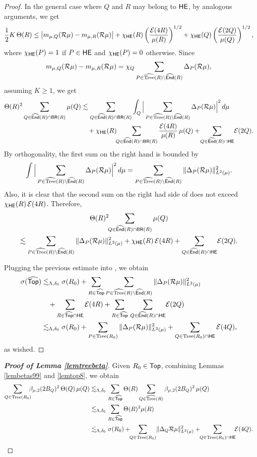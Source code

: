 \begin{proof}
In the general case where $Q$ and $R$ may belong to ${\mathsf {HE}}$, by analogous arguments, we get
$$\frac12K\,\Theta(R) \leq 
\big|m_{\mu,Q}({\mathcal R}\mu) - m_{\mu,R}({\mathcal R}\mu)\big| + \chi_{\mathsf {HE}}(R) \left(\frac{{\mathcal E}(4R)}{\mu(R)}\right)^{1/2}
+ \chi_{\mathsf {HE}}(Q) \left(\frac{{\mathcal E}(2Q)}{\mu(Q)}\right)^{1/2},$$
where $\chi_{\mathsf {HE}}(P)=1$ if $P\in{\mathsf {HE}}$ and $\chi_{\mathsf {HE}}(P)=0$ otherwise. Since
$$m_{\mu,Q}({\mathcal R}\mu) - m_{\mu,R}({\mathcal R}\mu) = \chi_Q \sum_{P\in{\widehat{{\rm Tree}}}(R)\setminus{\widehat{{\mathsf{End}}}}(R)}\Delta_P({\mathcal R}\mu),$$
assuming $K\geq1$, we get
\begin{align}\label{eqfje42}
\Theta(R)^2\sum_{Q\in{\widehat{{\mathsf{End}}}}(R)\cap{\mathsf {BR}}(R)}\mu(Q) &\lesssim 
\sum_{Q\in{\widehat{{\mathsf{End}}}}(R)\cap{\mathsf {BR}}(R)} \int_Q \Big|\sum_{P\in{\widehat{{\rm Tree}}}(R)\setminus{\widehat{{\mathsf{End}}}}(R)}\Delta_P({\mathcal R}\mu)
\Big|^2\,d\mu \\
&\quad + \chi_{\mathsf {HE}}(R)\!\!\sum_{Q\in{\widehat{{\mathsf{End}}}}(R)\cap{\mathsf {BR}}(R)}  \frac{{\mathcal E}(4R)}{\mu(R)}\,\mu(Q) +\!
\sum_{Q\in{\widehat{{\mathsf{End}}}}(R)\cap{\mathsf {HE}}} \! {\mathcal E}(2Q).\nonumber
\end{align}
By orthogonality, the first sum on the right hand is bounded by
$$\int \Big|\sum_{P\in{\widehat{{\rm Tree}}}(R)\setminus{\widehat{{\mathsf{End}}}}(R)}\Delta_P({\mathcal R}\mu)
\Big|^2\,d\mu = \sum_{P\in{\widehat{{\rm Tree}}}(R)\setminus{\widehat{{\mathsf{End}}}}(R)}\|\Delta_P({\mathcal R}\mu)\|_{L^2(\mu)}^2.$$
Also, it is clear that the second sum on the right had side of  does not exceed 
$\chi_{\mathsf {HE}}(R)\,{\mathcal E}(4R)$. Therefore,
\begin{multline*}
\Theta(R)^2\!\!\sum_{Q\in{\widehat{{\mathsf{End}}}}(R)\cap{\mathsf {BR}}(R)}\mu(Q) \\
\lesssim
\sum_{P\in{\widehat{{\rm Tree}}}(R)\setminus{\widehat{{\mathsf{End}}}}(R)}\|\Delta_P({\mathcal R}\mu)\|_{L^2(\mu)}^2
+ \chi_{\mathsf {HE}}(R)\,{\mathcal E}(4R) + \sum_{Q\in{\widehat{{\mathsf{End}}}}(R)\cap{\mathsf {HE}}} \! {\mathcal E}(2Q).
\end{multline*}

Plugging the previous estimate into , we obtain
\begin{align*}
\sigma({\widehat{{\mathsf {Top}}}})  & \lesssim_{\Lambda,\delta_0} \sigma(R_0) + \sum_{R\in{\widehat{{\mathsf {Top}}}}} 
\sum_{P\in{\widehat{{\rm Tree}}}(R)\setminus{\widehat{{\mathsf{End}}}}(R)}\|\Delta_P({\mathcal R}\mu)\|_{L^2(\mu)}^2\\
&\quad
+ \sum_{R\in{\widehat{{\mathsf {Top}}}}\cap{\mathsf {HE}}}{\mathcal E}(4R) +\sum_{R\in{\widehat{{\mathsf {Top}}}}}\,\sum_{Q\in{\widehat{{\mathsf{End}}}}(R)\cap{\mathsf {HE}}} \! {\mathcal E}(2Q)\\
& \lesssim_{\Lambda,\delta_0} \sigma(R_0) + \sum_{P\in{\rm Tree}(R_0)} 
\|\Delta_P({\mathcal R}\mu)\|_{L^2(\mu)}^2 
+ \sum_{Q\in{\rm Tree}(R_0)\cap{\mathsf {HE}}}{\mathcal E}(4Q),
\end{align*}
as wished.
\end{proof}
\vv


\begin{proof}[\bf Proof of Lemma \ref{lemtreebeta}]
Given $R_0\in{\mathsf {Top}}$, combining Lemmas \ref{lembetas99} and \ref{lemtop8}, we obtain
\begin{align*}
\sum_{Q\in\tree(R_0)} \!\!\!\beta_{\mu,2}(2B_Q)^2\,\Theta(Q)\,\mu(Q)  & 
\lesssim_{\Lambda,\delta_0}  \sum_{R\in \wh\ttt} \Theta(R)\sum_{Q\in\wh\tree(R)} \beta_{\mu,2}(2B_Q)^2\,\mu(Q)\\
& \lesssim_{\Lambda,\delta_0}  \sum_{R\in \wh\ttt} \Theta(R)^2 \mu(R)\\
& 
\lesssim_{\Lambda,\delta_0}\sigma(R_0) +\!\!\sum_{Q\in\tree(R_0)}\!\|\Delta_Q\RR\mu\|_{L^2(\mu)}^2+ \!\!\sum_{Q\in\tree(R_0)\cap\HE}\! \!\EE(4Q).
\end{align*}
\end{proof}


